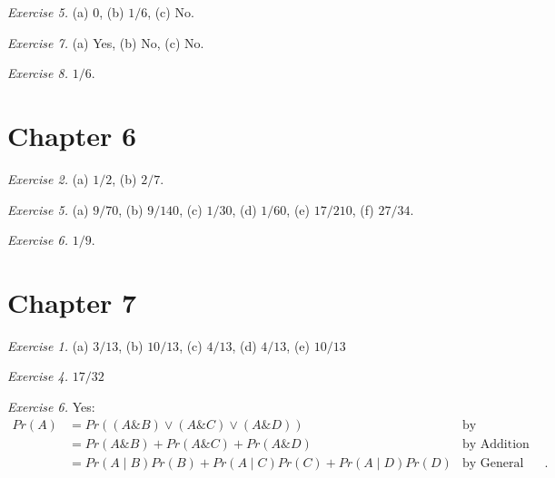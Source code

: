 \documentclass[justified]{tufte-book}
\newcommand{\given}{\mid}
\renewcommand{\wedge}{\mathbin{\&}}
\newcommand{\p}{Pr}
\theoremstyle{definition}
\theoremstyle{definition}
\theoremstyle{definition}
\theoremstyle{definition}
\theoremstyle{remark}
\begin{document}
\vspace{.5em}

\noindent
\emph{Exercise 5.} (a) \(0\), (b) \(1/6\), (c) No.

\vspace{.5em}

\noindent
\emph{Exercise 7.} (a) Yes, (b) No, (c) No.

\vspace{.5em}

\noindent
\emph{Exercise 8.} \(1/6\).

\hypertarget{chapter-6}{%
\section*{Chapter 6}\label{chapter-6}}

\noindent
\emph{Exercise 2.} (a) \(1/2\), (b) \(2/7\).

\vspace{.5em}

\noindent
\emph{Exercise 5.} (a) \(9/70\), (b) \(9/140\), (c) \(1/30\), (d) \(1/60\), (e) \(17/210\), (f) \(27/34\).

\vspace{.5em}

\noindent
\emph{Exercise 6.} \(1/9\).

\hypertarget{chapter-7}{%
\section*{Chapter 7}\label{chapter-7}}

\noindent
\emph{Exercise 1.} (a) \(3/13\), (b) \(10/13\), (c) \(4/13\), (d) \(4/13\), (e) \(10/13\)

\vspace{.5em}

\noindent
\emph{Exercise 4.} \(17/32\)

\vspace{.5em}

\noindent
\emph{Exercise 6.} Yes:
\[
  \begin{aligned}
    \p(A) 
    & = \p((A \wedge B) \vee (A \wedge C) \vee (A \wedge D))            & \text{by Equivalence}\\
    & = \p(A \wedge B) + \p(A \wedge C) + \p(A \wedge D)                & \text{by Addition}\\
    & = \p(A \given B)\p(B) + \p(A \given C)\p(C) + \p(A \given D)\p(D) & \text{by General Multiplication}.
  \end{aligned}
  \]
\end{document}
